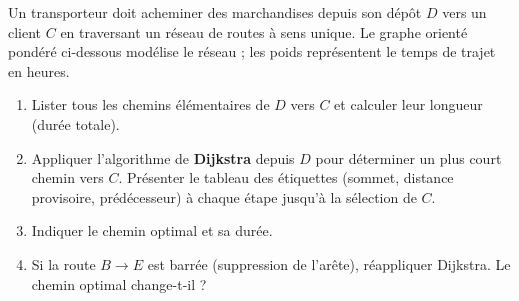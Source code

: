 \documentclass[11pt]{article}
\begin{document}
\begin{exercice}
Un transporteur doit acheminer des marchandises depuis son dépôt $D$ vers un client $C$ en traversant un réseau de routes à sens unique. Le graphe orienté pondéré ci-dessous modélise le réseau ; les poids représentent le temps de trajet en heures.
\begin{center}
\end{center}
\begin{enumerate}
\item Lister tous les chemins élémentaires de $D$ vers $C$ et calculer leur longueur (durée totale).
\item Appliquer l'algorithme de \textbf{Dijkstra} depuis $D$ pour déterminer un plus court chemin vers $C$. Présenter le tableau des étiquettes (sommet, distance provisoire, prédécesseur) à chaque étape jusqu'à la sélection de $C$.
\item Indiquer le chemin optimal et sa durée.
\item Si la route $B \to E$ est barrée (suppression de l'arête), réappliquer Dijkstra. Le chemin optimal change-t-il ?
\end{enumerate}
\end{exercice}
\end{document}
